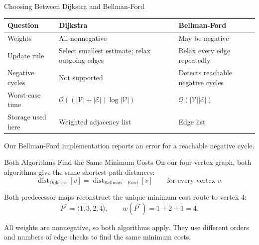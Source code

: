 \documentclass[aspectratio=169,11pt]{beamer}
\begin{document}
\begin{frame}{Choosing Between Dijkstra and Bellman-Ford}
  \renewcommand{\arraystretch}{1.18}
  \begin{tabularx}{\textwidth}{@{}>{\vnmedium}p{}@{\hspace{1em}}Y@{\hspace{1em}}Y@{}}
    \toprule
    Question & Dijkstra & Bellman-Ford \\
    \midrule
    Weights & All nonnegative & May be negative \\
    \addlinespace[0.5em]
    Update rule & Select smallest estimate; relax outgoing edges & Relax every edge repeatedly \\
    \addlinespace[0.5em]
    Negative cycles & Not supported & Detects reachable negative cycles \\
    \addlinespace[0.5em]
    Worst-case time & $\mathcal O((|\mathcal V|+|\mathcal E|)\log|\mathcal V|)$ & $\mathcal O(|\mathcal V||\mathcal E|)$ \\
    \addlinespace[0.5em]
    Storage used here & Weighted adjacency list & Edge list \\
    \bottomrule
  \end{tabularx}

  \vspace{0.7em}
  Our Bellman-Ford implementation reports an error for a reachable negative cycle.
\end{frame}

\begin{frame}{Both Algorithms Find the Same Minimum Costs}
  On our four-vertex graph, both algorithms give the same shortest-path distances:
  \[
    \operatorname{dist}_{\mathrm{Dijkstra}}[v]
    =\operatorname{dist}_{\mathrm{Bellman-Ford}}[v]
    \qquad\text{for every vertex }v.
  \]

  Both predecessor maps reconstruct the unique minimum-cost route to vertex 4:
  \[
    P^*=\langle1,3,2,4\rangle,
    \qquad w(P^*)=1+2+1=4.
  \]

  \vspace{0.8em}
  All weights are nonnegative, so both algorithms apply. They use different
  orders and numbers of edge checks to find the same minimum costs.
\end{frame}
\end{document}
